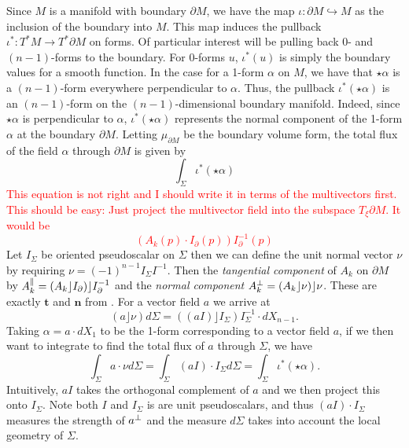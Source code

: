 \documentclass[12pt]{article}
\begin{document}
Since $M$ is a manifold with boundary $\partial M$, we have the map $\iota \colon \partial M \hookrightarrow M$ as the inclusion of the boundary into $M$.  This map induces the pullback $\iota^* \colon T^*M \to T^* \partial M$ on forms. Of particular interest will be pulling back 0- and $(n-1)$-forms to the boundary. For 0-forms $u$, $\iota^*(u)$ is simply the boundary values for a smooth function. In the case for a 1-form $\alpha$ on $M$, we have that $\star \alpha$ is a $(n-1)$-form everywhere perpendicular to $\alpha$.  Thus, the pullback $\iota^*( \star \alpha)$ is an $(n-1)$-form on the $(n-1)$-dimensional boundary manifold.  Indeed, since $\star \alpha$ is perpendicular to $\alpha$, $\iota^*( \star \alpha)$ represents the normal component of the 1-form $\alpha$ at the boundary $\partial M$. Letting $\mu_{\partial M}$ be the boundary volume form, the total flux of the field $\alpha$ through $\partial M$ is given by
\begin{equation}
\label{eq:flux}
\int_\Sigma \iota^* (\star \alpha) 
\end{equation}
\textcolor{red}{This equation is not right and I should write it in terms of the multivectors first. This should be easy: Just project the multivector field into the subspace $T_\xi \partial M$. It would be
\[
(A_k(p) \cdot I_\partial(p))I_\partial^{-1}(p)
\]
}
Let $I_\Sigma$ be oriented pseudoscalar on $\Sigma$ then we can define the unit normal vector $\nu$ by requiring $\nu = (-1)^{n-1} I_\Sigma I^{-1}$.  Then the \emph{tangential component} of $A_k$ on $\partial M$ by $A_k^\parallel = (A_k \rfloor I_\partial)\rfloor I_\partial^{-1}$ and the \emph{normal component} $A_k^\perp = (A_k \rfloor \nu)\rfloor \nu$. These are exactly $\mathbf{t}$ and $\mathbf{n}$ from \cite{schwarz_hodge_1995}. For a vector field $a$ we arrive at
\[
(a \rfloor \nu)d\Sigma  = ((aI) \rfloor I_\Sigma) I_{\Sigma}^{-1} \cdot dX_{n-1}.
\]
Taking $\alpha = a\cdot dX_1$ to be the 1-form corresponding to a vector field $a$, if we then want to integrate to find the total flux of $a$ through $\Sigma$, we have
\[
\int_\Sigma a\cdot \nu d\Sigma = \int_\Sigma (aI)\cdot I_\Sigma d\Sigma = \int_\Sigma \iota^*(\star \alpha ).
\]
Intuitively, $aI$ takes the orthogonal complement of $a$ and we then project this onto $I_\Sigma$. Note both $I$ and $I_\Sigma$ is are unit pseudoscalars, and thus $(aI)\cdot  I_\Sigma$ measures the strength of $a^\perp$ and the measure $d\Sigma$ takes into account the local geometry of $\Sigma$.  
\end{document}
